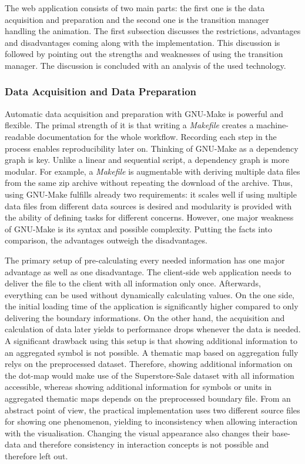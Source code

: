 The web application consists of two main parts: the first one is the data acquisition and preparation and the second one is the transition manager handling the animation. The first subsection discusses the restrictions, advantages and disadvantages coming along with the implementation. This discussion is followed by pointing out the strengths and weaknesses of using the transition manager. The discussion is concluded with an analysis of the used technology.

\subsubsection{Data Acquisition and Data Preparation}
Automatic data acquisition and preparation with GNU-Make is powerful and flexible. The primal strength of it is that writing a \textit{Makefile} creates a machine-readable documentation for the whole workflow. Recording each step in the process enables reproducibility later on.
Thinking of GNU-Make as a dependency graph is key. Unlike a linear and sequential script, a dependency graph is more modular. For example, a \textit{Makefile} is augmentable with deriving multiple data files from the same zip archive without repeating the download of the archive. Thus, using GNU-Make fulfills already two requirements: it scales well if using multiple data files from different data sources is desired and modularity is provided with the ability of defining tasks for different concerns. However, one major weakness of GNU-Make is its syntax and possible complexity. Putting the facts into comparison, the advantages outweigh the disadvantages.

The primary setup of pre-calculating every needed information has one major advantage as well as one disadvantage. The client-side web application needs to deliver the file to the client with all information only once. Afterwards, everything can be used without dynamically calculating values. On the one side, the initial loading time of the application is significantly higher compared to only delivering the boundary informations. On the other hand, the acquisition and calculation of data later yields to performance drops whenever the data is needed.
A significant drawback using this setup is that showing additional information to an aggregated symbol is not possible. A thematic map based on aggregation fully relys on the preprocessed dataset. Therefore, showing additional information on the dot-map would make use of the Superstore-Sale dataset with all information accessible, whereas showing additional information for symbols or units in aggregated thematic maps depends on the preprocessed boundary file. From an abstract point of view, the practical implementation uses two different source files for showing one phenomenon, yielding to inconsistency when allowing interaction with the visualisation. Changing the visual appearance also changes their base-data and therefore consistency in interaction concepts is not possible and therefore left out.

